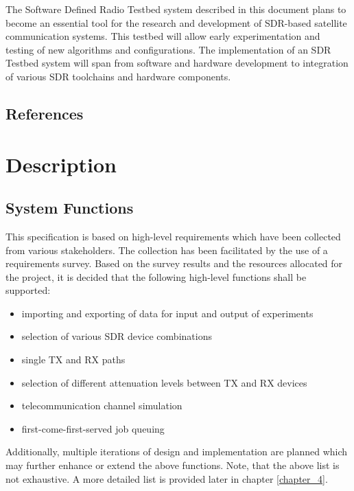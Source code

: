 \documentclass[english,titlepage,a4paper]{report}
\begin{document}
The Software Defined Radio Testbed system described in this document plans to become an essential tool for the research and development of SDR-based satellite communication systems.
This testbed will allow early experimentation and testing of new algorithms and configurations.
The implementation of an SDR Testbed system will span from software and hardware development to integration of various SDR toolchains and hardware components.

\section{References}


\chapter{Description}
\section{System Functions}

This specification is based on high-level requirements which have been collected from various stakeholders.
The collection has been facilitated by the use of a requirements survey.
Based on the survey results and the resources allocated for the project, it is decided that the following high-level functions shall be supported:
\begin{itemize}
\item importing and exporting of data for input and output of experiments
\item selection of various SDR device combinations
\item single TX and RX paths
\item selection of different attenuation levels between TX and RX devices
\item telecommunication channel simulation
\item first-come-first-served job queuing
\end{itemize}

Additionally, multiple iterations of design and implementation are planned which may further enhance or extend the above functions.
Note, that the above list is not exhaustive.
A more detailed list is provided later in chapter \ref{chapter_4}.
\end{document}
